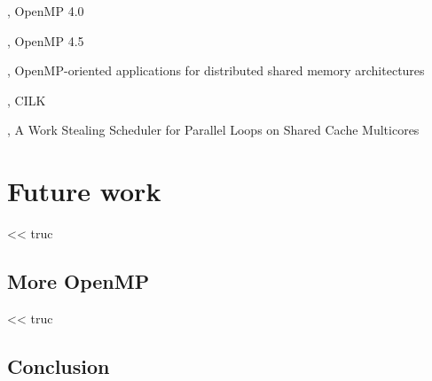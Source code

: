 




\cite{openmp40}, OpenMP 4.0

\cite{openmp45}, OpenMP 4.5

\cite{Marowka2004}, OpenMP-oriented applications for distributed shared memory architectures

\cite{cilk5}, CILK

\cite{Tchiboukdjian2010}, A Work Stealing Scheduler for Parallel Loops on Shared Cache Multicores









\part{Future work}

\begin{savequote}[6cm]
<< truc
\end{savequote}

\chapter{More OpenMP}\label{chap:contrib:TODO}
\chaptertoc

%

\begin{savequote}[6cm]
<< truc
\end{savequote}

\chapter{Conclusion}\label{chap:contrib:TODO}
\chaptertoc

%
%
